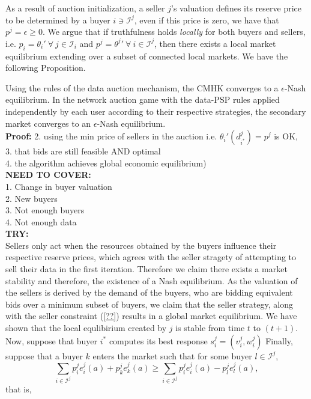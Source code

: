 \documentclass[12pt]{article}
\theoremstyle{definition}
\newcommand{\mcI}{\mathcal{I}}
\begin{document}
\begin{multicols}{2}
As a result of auction initialization, a seller $j$'s valuation defines its
reserve price to be determined
by a buyer $i \ni \mcI^j$, even if this price is zero, we have that $p^j = \epsilon \ge 0$.
We argue that if truthfulness holds \emph{locally} for both buyers and sellers, i.e. $p_i ={\theta_i}' \
\forall \ j \in \mcI_i$ and $p^j = {\theta^j}' \ \forall \ i \in\mcI^j$, then
there exists a local market equilibrium extending over a subset of connected
local markets. We have the following Proposition. 

{
}

{
Using the rules of the data auction mechanism, the CMHK
\cite{zheng} converges to a $\epsilon$-Nash equilibrium. In the network auction
game with the data-PSP rules applied independently by each user according to their respective strategies, the secondary market converges to an $\epsilon$-Nash
equilibrium. 
}\\
\textbf{Proof:}
2. using the min price of sellers in the auction i.e. ${\theta_i}'(d_{i^*}^j) =
p^j$ is OK, \\
3. that bids are still feasible AND optimal \\
4. the algorithm achieves global economic equilibrium)\\
\textbf{NEED TO COVER:}\\
1. Change in buyer valuation \\
2. New buyers\\
3. Not enough buyers \\
4. Not enough data\\
\textbf{TRY:}\\
Sellers only act when the resources obtained by the buyers influence their
respective reserve prices, which agrees with the seller stragety of attempting
to sell their data in the first iteration. Therefore we claim there exists a
market stability and therefore, the existence of a Nash equilibrium. As the
valuation of the sellers is derived by the demand of the buyers, who are
bidding equivalent bids over a minimum subset of buyers, we claim that the seller
strategy, along with the seller constraint (\ref{??}) results in a global
market equilibrium.
We have shown that the local
equlibirium created by $j$ is stable from time $t$ to $(t+1)$. 
Now, suppose that buyer $i^*$ computes its best response $s_i^j = (v_i^j, w_i^j)$
Finally, suppose that
a buyer $k$ enters the market such that for some buyer $l\in\mcI^j$,
$$
    \displaystyle\sum_{i\in\mcI^j} p_i^je_i^j(a) + p_k^je_k^j(a) \ge
\sum_{i\in\mcI^j} p_i^je_i^j(a) - p_l^je_l^j(a),
$$
that is,




\end{multicols}
\end{document}
